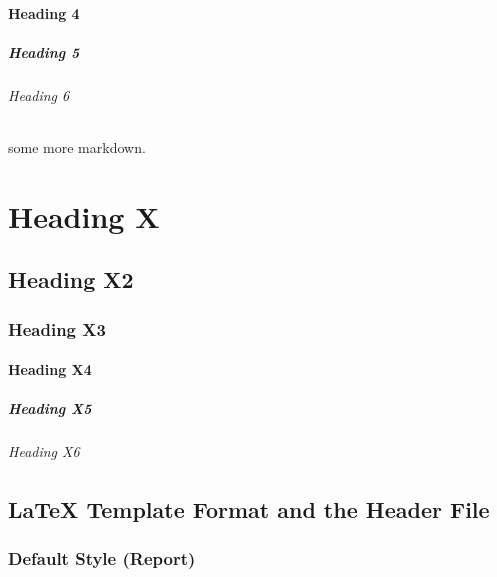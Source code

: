 \documentclass[english]{workpackage}[1996/06/02]
\begin{document}
\subsubsection{Heading 4}
\label{sec:Heading4}



\paragraph{Heading 5}
\label{sec:Heading5}



\subparagraph{Heading 6}
\label{sec:Heading6}


some more markdown.




\chapter{Heading X}
\label{sec:HeadingX}


\section{Heading X2}
\label{sec:HeadingX2}


\subsection{Heading X3}
\label{sec:HeadingX3}


\subsubsection{Heading X4}
\label{sec:HeadingX4}


\paragraph{Heading X5}
\label{sec:HeadingX5}


\subparagraph{Heading X6}
\label{sec:HeadingX6}



\section{LaTeX Template Format and the Header File}
\label{sec:LaTeXTemplateFormatandtheHeaderFile}



\subsection{Default Style (Report)}
\label{sec:DefaultStyleReport}
\end{document}
